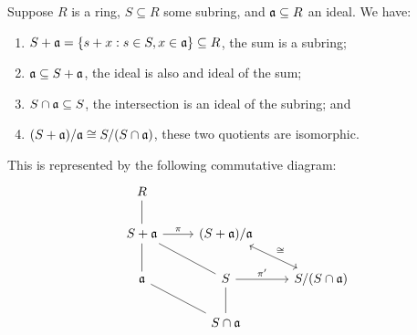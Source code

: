 \begin{theorem}\label{thm:iso-2-ring}
    Suppose \(R\) is a ring, \(S \subseteq R\) some subring,
    and \(\mathfrak{a} \subseteq R\) an ideal.
    We have:
    \begin{enumerate}[label={(\alph*)}, itemsep=0mm]
        \item \(S + \mathfrak{a} = \{s+x : s \in S, x \in \mathfrak{a}\} \subseteq R\),
            the sum is a subring;
        \item \(\mathfrak{a} \subseteq S + \mathfrak{a}\), the ideal is also and ideal of the sum;
        \item \(S \cap \mathfrak{a} \subseteq S\),
            the intersection is an ideal of the subring; and
        \item \((S+\mathfrak{a})/\mathfrak{a} \cong S/(S \cap \mathfrak{a})\),
            these two quotients are isomorphic.
    \end{enumerate}

    This is represented by the following commutative diagram:
    \begin{equation*}
        \begin{tikzcd}
            R \arrow[dash]{d} \\
            S+\mfk{a} \arrow[dash]{d} \arrow{r}{\pi} \arrow[dash]{rd} &
            (S+\mfk{a})/\mfk{a} \arrow[leftrightarrow]{rd}{\cong} \\
            \mfk{a} \arrow[dash]{rd} & S \arrow{r}{\pi'} \arrow[dash]{d} &
            S/(S \cap \mfk{a}) \\
            & S \cap \mfk{a}
        \end{tikzcd}
    \end{equation*}
\end{theorem}
